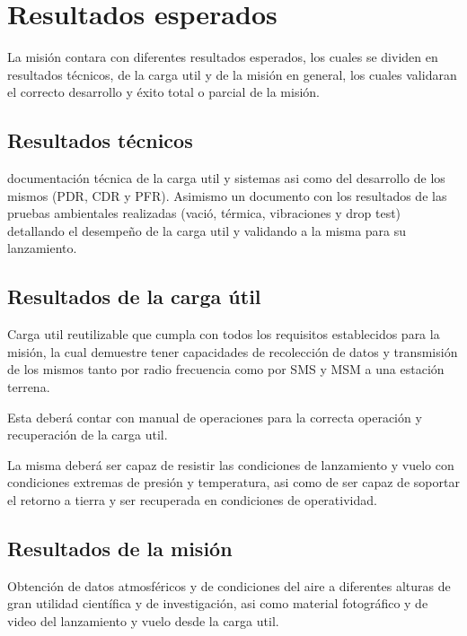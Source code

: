 \documentclass[letterpaper,12pt]{article} %
\begin{document}
    \newpage
\section{Resultados esperados}

    La misión contara con diferentes resultados esperados, los cuales se dividen en resultados técnicos, de la carga util y de la misión en general, 
    los cuales validaran el correcto desarrollo y éxito total o parcial de la misión.

    \subsection{Resultados técnicos}

    documentación técnica de la carga util y sistemas asi como del desarrollo de los mismos
    (PDR, CDR y PFR).
    Asimismo un documento con los resultados de las pruebas ambientales realizadas (vació, térmica, vibraciones y drop test)
    detallando el desempeño de la carga util y validando a la misma para su lanzamiento. 

    \subsection{Resultados de la carga útil}

    Carga util reutilizable que cumpla con todos los requisitos establecidos para la misión, la cual
    demuestre tener capacidades de recolección de datos y transmisión de los mismos tanto por radio
    frecuencia como por SMS y MSM a una estación terrena.
    
    Esta deberá contar con manual de operaciones 
    para la correcta operación y recuperación de la carga util.
    
    La misma deberá ser capaz de resistir las condiciones de lanzamiento y vuelo con condiciones extremas de presión y temperatura,
    asi como de ser capaz de soportar el retorno a tierra y ser recuperada en condiciones de operatividad.


    \subsection{Resultados de la misión}

    Obtención de datos atmosféricos y de condiciones del aire a diferentes alturas de gran utilidad
    científica y de investigación, asi como material fotográfico y de video del lanzamiento y vuelo desde la carga util.
    
\end{document}
